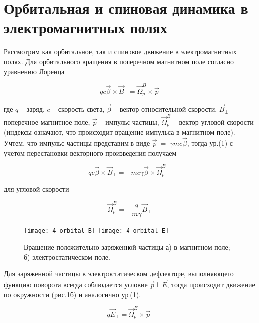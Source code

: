 \section{Орбитальная и спиновая динамика в электромагнитных полях}\label{sec:EDM/requirements/deflector}

\par Рассмотрим как орбитальное, так и спиновое движение в электромагнитных полях. Для орбитального вращения в поперечном магнитном поле согласно уравнению Лоренца

\begin{equation}
qc\vec{\beta}\times{\vec{B}}_\bot={\vec{\Omega}}_p^B\times\vec{p}
\end{equation}

\noindent где $q$ – заряд, $c$ – скорость света, $\vec{\beta}$ – вектор относительной скорости, ${\vec{B}}_\bot$ – поперечное магнитное поле, $\vec{p}$ – импульс частицы, ${\vec{\Omega}}_p^B$ – вектор угловой скорости (индексы означают, что происходит вращение импульса в магнитном поле). Учтем, что импульс частицы представим в виде $\vec{p}\ =\ \gamma mc\vec{\beta}$, тогда ур.(1) с учетом перестановки векторного произведения получаем

\begin{equation}	
qc\vec{\beta}\times{\vec{B}}_\bot=-mc\gamma\vec{\beta}\times{\vec{\Omega}}_p^B\ \ \ 	
\end{equation}

\noindent для угловой скорости

\begin{equation}
 {\vec{\Omega}}_p^B=-\frac{q}{m\gamma}{\vec{B}}_\bot
\end{equation} 

\begin{figure}[!h]
  \centering
	\texttt{[image: 4\_orbital\_B]}
	\texttt{[image: 4\_orbital\_E]}
   \caption{Вращение положительно заряженной частицы а) в магнитном поле; б) электростатическом поле.}
   \label{fig:4_orbital_B_E}
\end{figure}

\par Для заряженной частицы в электростатическом дефлекторе, выполняющего функцию поворота всегда соблюдается условие $\vec{p} \bot\ \vec{E}$, тогда происходит движение по окружности (рис.1б) и аналогично ур.(1).

\begin{equation}
q{\vec{E}}_\bot={\vec{\Omega}}_p^E\times\vec{p}\ 
\end{equation} 

